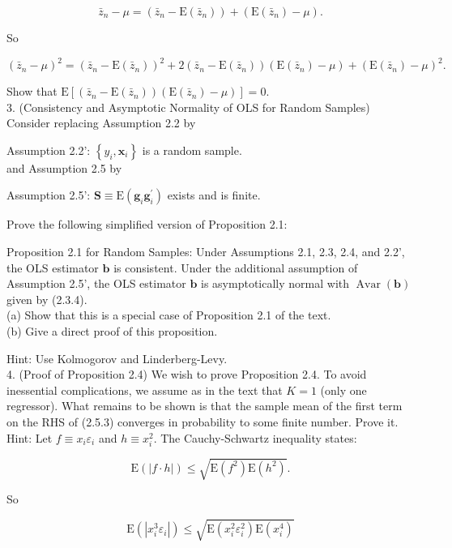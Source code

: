 \documentclass[10pt]{article}
\begin{document}
$$
\bar{z}_{n}-\mu=\left(\bar{z}_{n}-\mathrm{E}\left(\bar{z}_{n}\right)\right)+\left(\mathrm{E}\left(\bar{z}_{n}\right)-\mu\right) .
$$

So

$$
\left(\bar{z}_{n}-\mu\right)^{2}=\left(\bar{z}_{n}-\mathrm{E}\left(\bar{z}_{n}\right)\right)^{2}+2\left(\bar{z}_{n}-\mathrm{E}\left(\bar{z}_{n}\right)\right)\left(\mathrm{E}\left(\bar{z}_{n}\right)-\mu\right)+\left(\mathrm{E}\left(\bar{z}_{n}\right)-\mu\right)^{2} .
$$

Show that $\mathrm{E}\left[\left(\bar{z}_{n}-\mathrm{E}\left(\bar{z}_{n}\right)\right)\left(\mathrm{E}\left(\bar{z}_{n}\right)-\mu\right)\right]=0$.\\
3. (Consistency and Asymptotic Normality of OLS for Random Samples) Consider replacing Assumption 2.2 by

Assumption 2.2': $\left\{y_{i}, \mathbf{x}_{i}\right\}$ is a random sample.\\
and Assumption 2.5 by

Assumption 2.5': $\mathbf{S} \equiv \mathrm{E}\left(\mathbf{g}_{i} \mathbf{g}_{i}^{\prime}\right)$ exists and is finite.

Prove the following simplified version of Proposition 2.1:

Proposition 2.1 for Random Samples: Under Assumptions 2.1, 2.3, 2.4, and 2.2', the OLS estimator $\mathbf{b}$ is consistent. Under the additional assumption of Assumption 2.5', the OLS estimator $\mathbf{b}$ is asymptotically normal with $\operatorname{Avar}(\mathbf{b})$ given by (2.3.4).\\
(a) Show that this is a special case of Proposition 2.1 of the text.\\
(b) Give a direct proof of this proposition.

Hint: Use Kolmogorov and Linderberg-Levy.\\
4. (Proof of Proposition 2.4) We wish to prove Proposition 2.4. To avoid inessential complications, we assume as in the text that $K=1$ (only one regressor). What remains to be shown is that the sample mean of the first term on the RHS of (2.5.3) converges in probability to some finite number. Prove it. Hint: Let $f \equiv x_{i} \varepsilon_{i}$ and $h \equiv x_{i}^{2}$. The Cauchy-Schwartz inequality states:

$$
\mathrm{E}(|f \cdot h|) \leq \sqrt{\mathrm{E}\left(f^{2}\right) \mathrm{E}\left(h^{2}\right)} .
$$

So

$$
\mathrm{E}\left(\left|x_{i}^{3} \varepsilon_{i}\right|\right) \leq \sqrt{\mathrm{E}\left(x_{i}^{2} \varepsilon_{i}^{2}\right) \mathrm{E}\left(x_{i}^{4}\right)}
$$
\end{document}

